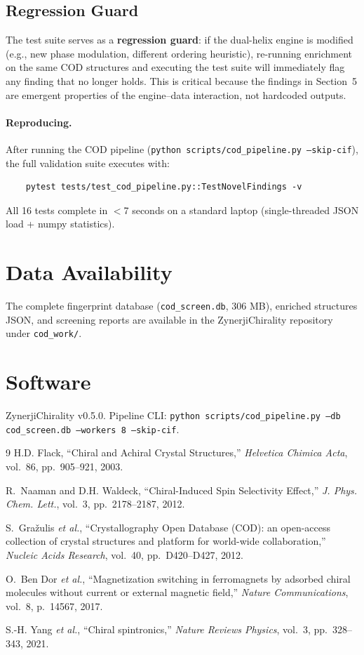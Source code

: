 \documentclass[11pt,a4paper]{article}
\begin{document}
\subsection{Regression Guard}

The test suite serves as a \textbf{regression guard}: if the dual-helix engine is modified (e.g., new phase modulation, different ordering heuristic), re-running enrichment on the same COD structures and executing the test suite will immediately flag any finding that no longer holds. This is critical because the findings in Section~5 are emergent properties of the engine--data interaction, not hardcoded outputs.

\paragraph{Reproducing.} After running the COD pipeline (\texttt{python scripts/cod\_pipeline.py --skip-cif}), the full validation suite executes with:
\begin{verbatim}
    pytest tests/test_cod_pipeline.py::TestNovelFindings -v
\end{verbatim}
\noindent All 16 tests complete in $<$7 seconds on a standard laptop (single-threaded JSON load + numpy statistics).

\section*{Data Availability}

The complete fingerprint database (\texttt{cod\_screen.db}, 306 MB), enriched structures JSON, and screening reports are available in the ZynerjiChirality repository under \texttt{cod\_work/}.

\section*{Software}

ZynerjiChirality v0.5.0. Pipeline CLI: \texttt{python scripts/cod\_pipeline.py --db cod\_screen.db --workers 8 --skip-cif}.

\begin{thebibliography}{9}
H.D. Flack, ``Chiral and Achiral Crystal Structures,'' \textit{Helvetica Chimica Acta}, vol.~86, pp.~905--921, 2003.

R.~Naaman and D.H. Waldeck, ``Chiral-Induced Spin Selectivity Effect,'' \textit{J. Phys. Chem. Lett.}, vol.~3, pp.~2178--2187, 2012.

S.~Gra\v{z}ulis \textit{et al.}, ``Crystallography Open Database (COD): an open-access collection of crystal structures and platform for world-wide collaboration,'' \textit{Nucleic Acids Research}, vol.~40, pp.~D420--D427, 2012.

O.~Ben Dor \textit{et al.}, ``Magnetization switching in ferromagnets by adsorbed chiral molecules without current or external magnetic field,'' \textit{Nature Communications}, vol.~8, p.~14567, 2017.

S.-H. Yang \textit{et al.}, ``Chiral spintronics,'' \textit{Nature Reviews Physics}, vol.~3, pp.~328--343, 2021.
\end{thebibliography}
\end{document}
